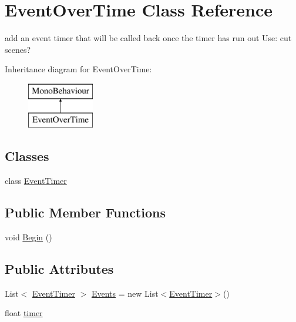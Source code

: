 \hypertarget{class_event_over_time}{}\section{Event\+Over\+Time Class Reference}
\label{class_event_over_time}


add an event timer that will be called back once the timer has run out Use\+: cut scenes?  


Inheritance diagram for Event\+Over\+Time\+:\begin{figure}[H]
\begin{center}
\leavevmode
\includegraphics[height=2.000000cm]{class_event_over_time}
\end{center}
\end{figure}
\subsection*{Classes}
\begin{DoxyCompactItemize}
\item 
class \mbox{\hyperlink{class_event_over_time_1_1_event_timer}{Event\+Timer}}
\end{DoxyCompactItemize}
\subsection*{Public Member Functions}
\begin{DoxyCompactItemize}
\item 
void \mbox{\hyperlink{class_event_over_time_a3b41cb8f467ea8154fbae0919282c355}{Begin}} ()
\end{DoxyCompactItemize}
\subsection*{Public Attributes}
\begin{DoxyCompactItemize}
\item 
List$<$ \mbox{\hyperlink{class_event_over_time_1_1_event_timer}{Event\+Timer}} $>$ \mbox{\hyperlink{class_event_over_time_ab24dd000934b03e1e753888a7531be81}{Events}} = new List$<$\mbox{\hyperlink{class_event_over_time_1_1_event_timer}{Event\+Timer}}$>$()
\item 
float \mbox{\hyperlink{class_event_over_time_a9664ec36e8634d7019f04d223be4a056}{timer}}
\end{DoxyCompactItemize}


